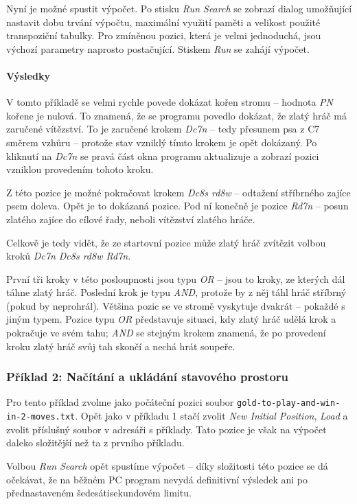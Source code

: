 \documentclass{article}
\begin{document}
Nyní je možné spustit výpočet. Po stisku \emph{Run Search} se zobrazí dialog umožňující nastavit dobu trvání výpočtu, maximální
využití paměti a velikost použité transpoziční tabulky. Pro zmíněnou pozici, která je velmi jednoduchá, jsou výchozí parametry 
naprosto postačující. Stiskem \emph{Run} se zahájí výpočet.

\paragraph{Výsledky}
V tomto příkladě se velmi rychle povede dokázat kořen stromu -- hodnota \emph{PN} kořene je nulová. To znamená, že se
programu povedlo dokázat, že zlatý hráč má zaručené vítězství. To je zaručené krokem \emph{Dc7n} -- tedy přesunem psa z
C7 směrem vzhůru -- protože stav vzniklý tímto krokem je opět dokázaný. Po kliknutí na \emph{Dc7n} se pravá část okna
programu aktualizuje a zobrazí pozici vzniklou provedením tohoto kroku.

Z této pozice je možné pokračovat krokem \emph{Dc8s rd8w} -- odtažení stříbrného zajíce psem doleva. Opět je to dokázaná
pozice. Pod ní konečně je pozice \emph{Rd7n} -- posun zlatého zajíce do cílové řady, neboli vítězství zlatého hráče.

Celkově je tedy vidět, že ze startovní pozice může zlatý hráč zvítězit volbou kroků \emph{Dc7n Dc8s rd8w Rd7n}.

První tři kroky v této posloupnosti jsou typu \emph{OR} -- jsou to kroky, ze kterých dál táhne zlatý hráč. Poslední krok
je typu \emph{AND}, protože by z něj táhl hráč stříbrný (pokud by neprohrál). Většina pozic se ve stromě vyskytuje
dvakrát -- pokaždé s jiným typem. Pozice typu \emph{OR} představuje situaci, kdy zlatý hráč udělá krok a pokračuje ve
svém tahu; \emph{AND} se stejným krokem znamená, že po provedení kroku zlatý hráč svůj tah skončí a nechá hrát soupeře.

\subsubsection{Příklad 2: Načítání a ukládání stavového prostoru}
\label{sec:gui-example-2}
Pro tento příklad zvolme jako počáteční pozici soubor \texttt{gold-to-play-and-win-in-2-moves.txt}. Opět jako v příkladu
1 stačí zvolit \emph{New Initial Position}, \emph{Load} a zvolit příslušný soubor v adresáři s příklady. Tato pozice je
však na výpočet daleko složitější než ta z prvního příkladu.

Volbou \emph{Run Search} opět spustíme výpočet -- díky složitosti této pozice se dá očekávat, že na běžném PC program
nevydá definitivní výsledek ani po přednastaveném šedesátisekundovém limitu.
\end{document}
